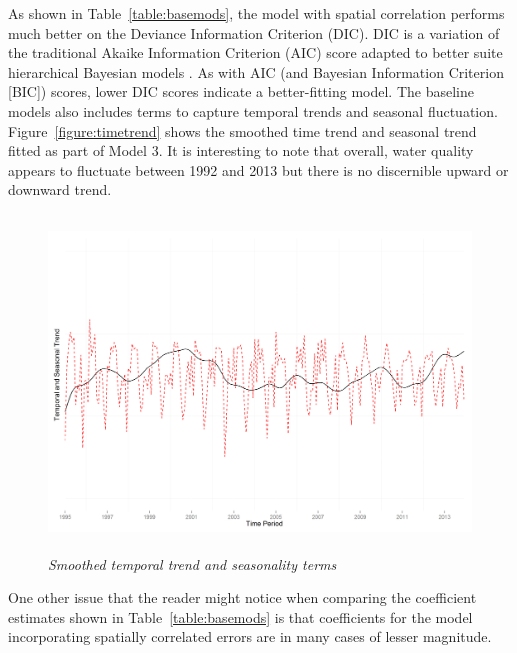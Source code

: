 \documentclass[12pt,a4paper,titlepage]{article}
\begin{document}
As shown in Table~\ref{table:basemods}, the model with spatial correlation performs much better on the Deviance Information Criterion (DIC). DIC is a variation of the traditional Akaike Information Criterion (AIC) score adapted to better suite hierarchical Bayesian models \parencite{ward2008,spiegelhalter2002}. As with AIC (and Bayesian Information Criterion [BIC]) scores, lower DIC scores indicate a better-fitting model. The baseline models also includes terms to capture temporal trends and seasonal fluctuation. Figure~\ref{figure:timetrend} shows the smoothed time trend and seasonal trend fitted as part of Model 3. It is interesting to note that overall, water quality appears to fluctuate between 1992 and 2013 but there is no discernible upward or downward trend.

\begin{figure}[!ht]
\graphicspath{ {`/Users/TScott/Google\space Drive/quinalt/APPAM_2014/'}}
\noindent
\includegraphics[trim = 4mm 3mm 5mm 18mm, clip, width=6in, height=3.5in]{timetrendplot.png}
\caption{\textit{Smoothed temporal trend and seasonality terms}}
\label{fig:timetrend}
\end{figure}

One other issue that the reader might notice when comparing the coefficient estimates shown in Table~\ref{table:basemods} is that coefficients for the model incorporating spatially correlated errors are in many cases of lesser magnitude. 
\end{document}
